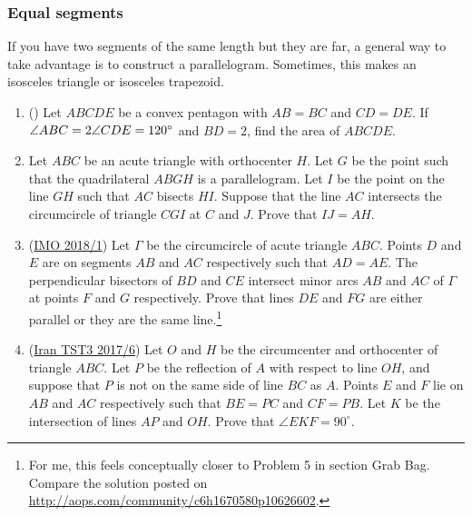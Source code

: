 \documentclass[11pt,paper=letter]{scrartcl}
\begin{document}
\subsubsection*{Equal segments}

If you have two segments of the same length but they are far, a general way to take advantage is to construct a parallelogram. Sometimes, this makes an isosceles triangle or isosceles trapezoid.

\begin{enumerate}
  \item (\cite{A}) Let $ABCDE$ be a convex pentagon with $AB = BC$ and $CD = DE$. If $\angle ABC = 2\angle CDE = 120^\circ$ and $BD = 2$, find the area of $ABCDE$. 

  \item Let $ABC$ be an acute triangle with orthocenter $H$. Let $G$ be the point such that the quadrilateral $ABGH$ is a parallelogram. Let $I$ be the point on the line $GH$ such that $AC$ bisects $HI$. Suppose that the line $AC$ intersects the circumcircle of triangle $CGI$ at $C$ and $J$. Prove that $IJ = AH$. %

  \item (\href{https://aops.com/community/c6h1670580}{IMO 2018/1}) Let $\Gamma$ be the circumcircle of acute triangle $ABC$. Points $D$ and $E$ are on segments $AB$ and $AC$ respectively such that $AD = AE$. The perpendicular bisectors of $BD$ and $CE$ intersect minor arcs $AB$ and $AC$ of $\Gamma$ at points $F$ and $G$ respectively. Prove that lines $DE$ and $FG$ are either parallel or they are the same line.\footnote{For me, this feels conceptually closer to Problem 5 in section Grab Bag. Compare the solution posted on \url{http://aops.com/community/c6h1670580p10626602}.}

  \item (\href{https://aops.com/community/c6h1438017}{Iran TST3 2017/6}) Let $O$ and $H$ be the circumcenter and orthocenter of triangle $ABC$. Let $P$ be the reflection of $A$ with respect to line $OH$, and suppose that $P$ is not on the same side of line $BC$ as $A$. Points $E$ and $F$ lie on $AB$ and $AC$ respectively such that $BE = PC$ and $CF = PB$. Let $K$ be the intersection of lines $AP$ and $OH$. Prove that $\angle EKF = 90^{\circ}$. 
\end{enumerate}
\end{document}
